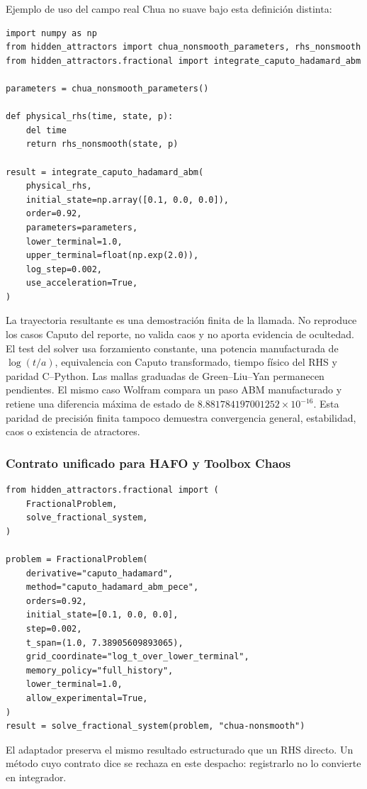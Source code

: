 Ejemplo de uso del campo real Chua no suave bajo esta definición distinta:
\begin{verbatim}
import numpy as np
from hidden_attractors import chua_nonsmooth_parameters, rhs_nonsmooth
from hidden_attractors.fractional import integrate_caputo_hadamard_abm

parameters = chua_nonsmooth_parameters()

def physical_rhs(time, state, p):
    del time
    return rhs_nonsmooth(state, p)

result = integrate_caputo_hadamard_abm(
    physical_rhs,
    initial_state=np.array([0.1, 0.0, 0.0]),
    order=0.92,
    parameters=parameters,
    lower_terminal=1.0,
    upper_terminal=float(np.exp(2.0)),
    log_step=0.002,
    use_acceleration=True,
)
\end{verbatim}
La trayectoria resultante es una demostración finita de la llamada. No reproduce
los casos Caputo del reporte, no valida caos y no aporta evidencia de ocultedad.
El test del solver usa forzamiento constante, una potencia manufacturada de
\(\log(t/a)\), equivalencia con Caputo transformado, tiempo físico del RHS y
paridad C--Python. Las mallas graduadas de Green--Liu--Yan
\cite{GreenLiuYan2021} permanecen pendientes. El mismo caso Wolfram compara un
paso ABM manufacturado y retiene una diferencia máxima de estado de
\(8.881784197001252\times10^{-16}\). Esta paridad de precisión finita tampoco
demuestra convergencia general, estabilidad, caos o existencia de atractores.

\subsubsection{Contrato unificado para HAFO y Toolbox Chaos}

\begin{verbatim}
from hidden_attractors.fractional import (
    FractionalProblem,
    solve_fractional_system,
)

problem = FractionalProblem(
    derivative="caputo_hadamard",
    method="caputo_hadamard_abm_pece",
    orders=0.92,
    initial_state=[0.1, 0.0, 0.0],
    step=0.002,
    t_span=(1.0, 7.38905609893065),
    grid_coordinate="log_t_over_lower_terminal",
    memory_policy="full_history",
    lower_terminal=1.0,
    allow_experimental=True,
)
result = solve_fractional_system(problem, "chua-nonsmooth")
\end{verbatim}
El adaptador preserva el mismo resultado estructurado que un RHS directo. Un
método cuyo contrato dice  se rechaza en este
despacho: registrarlo no lo convierte en integrador.

